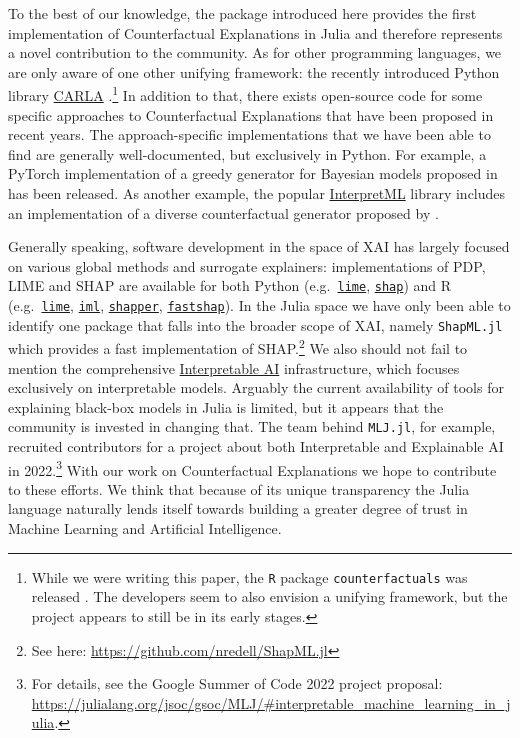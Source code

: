 \documentclass[
  letterpaper,
  DIV=11,
  numbers=noendperiod]{scrartcl}
\begin{document}
To the best of our knowledge, the package introduced here provides the
first implementation of Counterfactual Explanations in Julia and
therefore represents a novel contribution to the community. As for other
programming languages, we are only aware of one other unifying
framework: the recently introduced Python library
\href{https://carla-counterfactual-and-recourse-library.readthedocs.io/en/latest/?badge=latest}{CARLA}
\cite{pawelczyk2021carla}.\footnote{While we were writing this paper,
  the \texttt{R} package \texttt{counterfactuals} was released
  \cite{dandle2023counterfactuals}. The developers seem to also envision
  a unifying framework, but the project appears to still be in its early
  stages.} In addition to that, there exists open-source code for some
specific approaches to Counterfactual Explanations that have been
proposed in recent years. The approach-specific implementations that we
have been able to find are generally well-documented, but exclusively in
Python. For example, a PyTorch implementation of a greedy generator for
Bayesian models proposed in \cite{schut2021generating} has been
released. As another example, the popular
\href{https://github.com/interpretml}{InterpretML} library includes an
implementation of a diverse counterfactual generator proposed by
\cite{mothilal2020explaining}.

Generally speaking, software development in the space of XAI has largely
focused on various global methods and surrogate explainers:
implementations of PDP, LIME and SHAP are available for both Python
(e.g.~\href{https://github.com/marcotcr/lime}{\texttt{lime}},
\href{https://github.com/slundberg/shap}{\texttt{shap}}) and R
(e.g.~\href{https://cran.r-project.org/web/packages/lime/index.html}{\texttt{lime}},
\href{https://cran.r-project.org/web/packages/lime/index.html}{\texttt{iml}},
\href{https://modeloriented.github.io/shapper/}{\texttt{shapper}},
\href{https://github.com/bgreenwell/fastshap}{\texttt{fastshap}}). In
the Julia space we have only been able to identify one package that
falls into the broader scope of XAI, namely \texttt{ShapML.jl} which
provides a fast implementation of SHAP.\footnote{See here:
  \url{https://github.com/nredell/ShapML.jl}} We also should not fail to
mention the comprehensive
\href{https://docs.interpretable.ai/stable/IAIBase/data/}{Interpretable
AI} infrastructure, which focuses exclusively on interpretable models.
Arguably the current availability of tools for explaining black-box
models in Julia is limited, but it appears that the community is
invested in changing that. The team behind \texttt{MLJ.jl}, for example,
recruited contributors for a project about both Interpretable and
Explainable AI in 2022.\footnote{For details, see the Google Summer of
  Code 2022 project proposal:
  \url{https://julialang.org/jsoc/gsoc/MLJ/\#interpretable_machine_learning_in_julia}.}
With our work on Counterfactual Explanations we hope to contribute to
these efforts. We think that because of its unique transparency the
Julia language naturally lends itself towards building a greater degree
of trust in Machine Learning and Artificial Intelligence.
\end{document}
